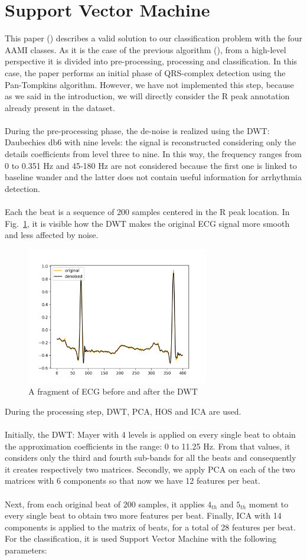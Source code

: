 \documentclass[LaM,binding=0.6cm]{sapthesis}
\begin{document}
\section{Support Vector Machine \cite{svmnl}}
This paper (\cite{svmnl}) describes a valid solution to our classification problem with the four AAMI classes. As it is the case of the previous algorithm (\cite{forest}), from a high-level perspective it is divided into pre-processing, processing and classification. In this case, the paper performs an initial phase of QRS-complex detection using the Pan-Tompkins algorithm. However, we have not implemented this step, because as we said in the introduction, we will directly consider the R peak annotation already present in the dataset.\\\\During the pre-processing phase, the de-noise is realized using the DWT: Daubechies db6 with nine levels: the signal is reconstructed considering only the details coefficients from level three to nine. In this way, the frequency ranges from 0 to 0.351 Hz and 45-180 Hz are not considered because the first one is linked to baseline wander and the latter does not contain useful information for arrhythmia detection.\\\\Each the beat is a sequence of 200 samples centered in the R peak location. In Fig.~\ref{fig:svc1}, it is visible how the DWT makes the original ECG signal more smooth and less affected by noise.
\begin{figure}  \centering
    \includegraphics[width=80mm,scale=0.7]{svm-before-after}
    \caption{A fragment of ECG before and after the DWT}
    \label{fig:svc1}
\end{figure}
During the processing step, DWT, PCA, HOS and ICA are used.\\\\Initially, the DWT: Mayer with 4 levels is 
applied on every single beat to obtain the approximation coefficients in the range: 0 to 11.25 Hz. From that values, it considers only the third and fourth sub-bands for all the beats and consequently it creates respectively two matrices. Secondly, we apply PCA on each of the two matrices with 6 components so that now we have 12 features per beat.\\\\Next, from each original beat of 200 samples, it applies $4_{th}$ and $5_{th}$ moment to every single beat to obtain two more features per beat. Finally, ICA with 14 components is applied to the matrix of beats, for a total of 28 features per beat. For the classification, it is used Support Vector Machine with the following parameters:
\end{document}
